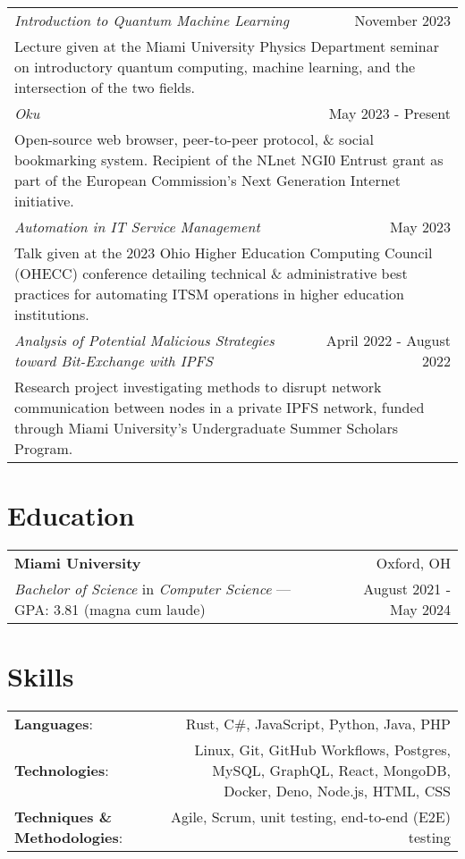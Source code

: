 \documentclass[letterpaper,10pt]{article} %
\begin{document}
\scriptsize{
\begin{tabular*}{\linewidth}{@{\extracolsep{\fill}} lr }
\emph{Introduction to Quantum Machine Learning} & November 2023\\
\multicolumn{2}{p{\linewidth}}{Lecture given at the Miami University Physics Department seminar on introductory quantum computing, machine learning, and the intersection of the two fields.}\\
\emph{Oku} & May 2023 - Present\\
\multicolumn{2}{p{\linewidth}}{Open-source web browser, peer-to-peer protocol, \& social bookmarking system. Recipient of the NLnet NGI0 Entrust grant as part of the European Commission's Next Generation Internet initiative.}\\
\emph{Automation in IT Service Management} & May 2023\\
\multicolumn{2}{p{\linewidth}}{Talk given at the 2023 Ohio Higher Education Computing Council (OHECC) conference detailing technical \& administrative best practices for automating ITSM operations in higher education institutions.}\\
\emph{Analysis of Potential Malicious Strategies toward Bit-Exchange with IPFS} & April 2022 - August 2022\\
\multicolumn{2}{p{\linewidth}}{Research project investigating methods to disrupt network communication between nodes in a private IPFS network, funded through Miami University's Undergraduate Summer Scholars Program.}\\
\end{tabular*}}

\section{Education}
\scriptsize{
\begin{tabular*}{\linewidth}{@{\extracolsep{\fill}} lr }
\textbf{Miami University} & Oxford, OH\\
\emph{Bachelor of Science} in \emph{Computer Science} --- GPA\@: 3.81 (magna cum laude) & August 2021 - May 2024
\end{tabular*}}

\section{Skills}
\scriptsize{
\begin{tabular*}{\linewidth}{@{\extracolsep{\fill}} lr }
\textbf{Languages}: & Rust, C\#, JavaScript, Python, Java, PHP\\
\textbf{Technologies}: & Linux, Git, GitHub Workflows, Postgres, MySQL, GraphQL, React, MongoDB, Docker, Deno, Node.js, HTML, CSS\\
\textbf{Techniques \& Methodologies}: & Agile, Scrum, unit testing, end-to-end (E2E) testing
\end{tabular*}}
\end{document}
